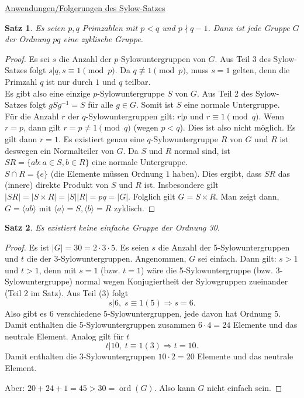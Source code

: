 \documentclass[12pt]{scrartcl}%
\newtheorem{thm}{Satz}
\theoremstyle{definition}
\theoremstyle{remark}
\DeclareMathOperator\ord{ord}
\begin{document}
\underline{Anwendungen/Folgerungen des Sylow-Satzes}

\begin{thm}
	Es seien $p, q$ Primzahlen mit $p < q$ und $p \nmid q-1$. Dann ist jede Gruppe $G$ der Ordnung $pq$ eine zyklische Gruppe.
\end{thm}

\begin{proof}
	Es sei $s$ die Anzahl der $p$-Sylowuntergruppen von $G$. Aus Teil 3 des Sylow-Satzes folgt $s | q, s \equiv 1 \pmod{p}$. Da $q \not \equiv 1 \pmod{p}$, muss $s = 1$ gelten, denn die Primzahl $q$ ist nur durch $1$ und $q$ teilbar. \\
	Es gibt also eine einzige $p$-Sylowuntergruppe $S$ von $G$. Aus Teil 2 des Sylow-Satzes folgt $gSg^{-1} = S$ für alle $g \in G$. Somit ist $S$ eine normale Untergruppe. \\
	Für die Anzahl $r$ der $q$-Sylowuntergruppen gilt: $r | p$ und $r \equiv 1 \pmod{q}$. Wenn $r = p$, dann gilt $r = p \not = 1 \pmod{q}$ (wegen $p < q$). Dies ist also nicht möglich. Es gilt dann $r = 1$. Es existiert genau eine $q$-Sylowuntergruppe $R$ von $G$ und $R$ ist deswegen ein Normalteiler von $G$. Da $S$ und $R$ normal sind, ist $SR = \{ ab : a \in S, b \in R\}$ eine normale Untergruppe. \\
	$S \cap R = \{ e\}$ (die Elemente müssen Ordnung $1$ haben). Dies ergibt, dass $SR$ das (innere) direkte Produkt von $S$ und $R$ ist. Insbesondere gilt $|SR| = |S \times R| = |S||R| = pq = |G|$. Folglich gilt $G = S \times R$. Man zeigt dann, $G = \langle ab \rangle \text{ mit } \langle a \rangle = S, \langle b \rangle = R$ zyklisch.
\end{proof}

\begin{thm}
    Es existiert keine einfache Gruppe der Ordnung 30.
\end{thm}

\begin{proof}
    Es ist $|G| = 30 = 2\cdot 3\cdot 5$. Es seien $s$ die Anzahl der 5-Sylowuntergruppen und $t$ die der 3-Sylowuntergruppen. Angenommen, $G$ sei einfach. Dann gilt: $s>1$ und $t>1$, denn mit $s=1$ (bzw. $t=1$) wäre die 5-Sylowuntergruppe (bzw. 3-Sylowuntergruppe) normal wegen Konjugiertheit der Sylowgruppen zueinander (Teil 2 im Satz). Aus Teil (3) folgt
        \[ s|6,\; s\equiv 1(5)\Rightarrow s=6.\]
    Also gibt es 6 verschiedene 5-Sylowuntergruppen, jede davon hat Ordnung $5$. Damit enthalten die 5-Sylowuntergruppen zusammen $6\cdot 4 =24$ Elemente und das neutrale Element. Analog gilt für $t$
        \[ t|10,\; t\equiv 1(3) \Rightarrow t=10.\]
    Damit enthalten die 3-Sylowuntergruppen $10\cdot 2=20$ Elemente und das neutrale Element.
    
    Aber: $20+24+1=45>30=\ord(G)$. Also kann $G$ nicht einfach sein.
\end{proof}
\end{document}
